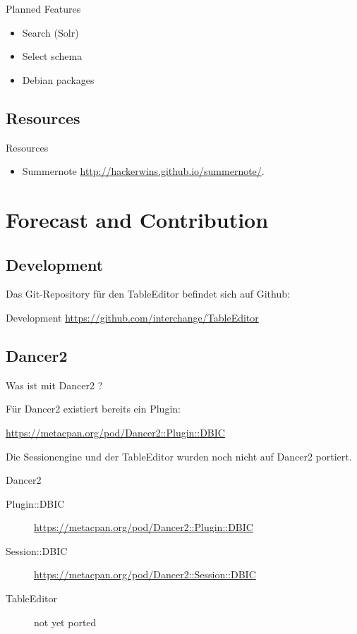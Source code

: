 \begin{frame}{Planned Features}
\begin{itemize}
\item Search (Solr)
\item Select schema
\item Debian packages
\end{itemize}
\end{frame}

\subsection{Resources}

\begin{frame}{Resources}
\begin{itemize}
\item Summernote \url{http://hackerwins.github.io/summernote/}.
\end{itemize}
\end{frame}{}
\section{Forecast and Contribution}

\subsection{Development}

Das Git-Repository für den TableEditor befindet sich auf Github:

\begin{frame}{Development}
\url{https://github.com/interchange/TableEditor}
\end{frame}

\subsection{Dancer2}

Was ist mit Dancer2 ?

Für Dancer2 existiert bereits ein Plugin:

\url{https://metacpan.org/pod/Dancer2::Plugin::DBIC}

Die Sessionengine und der TableEditor wurden noch nicht auf Dancer2 portiert.

\begin{frame}{Dancer2}
  \begin{description}
  \item[Plugin::DBIC] \url{https://metacpan.org/pod/Dancer2::Plugin::DBIC}
  \item[Session::DBIC] \url{https://metacpan.org/pod/Dancer2::Session::DBIC}
  \item[TableEditor] not yet ported
  \end{description}
\end{frame}


